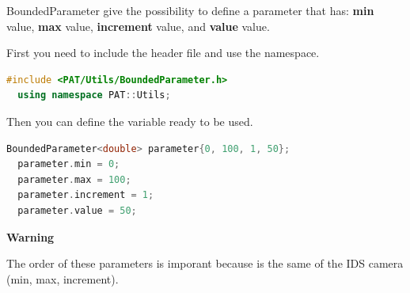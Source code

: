 
BoundedParameter give the possibility to define a parameter that has:
\textbf{min} value, \textbf{max} value, \textbf{increment} value, and
\textbf{value} value.

First you need to include the header file and use the namespace.

\begin{lstlisting}[language=c++, gobble=2]
  #include <PAT/Utils/BoundedParameter.h>
  using namespace PAT::Utils;
\end{lstlisting}

Then you can define the variable ready to be used.

\begin{lstlisting}[language=c++, gobble=2]
  BoundedParameter<double> parameter{0, 100, 1, 50};
  parameter.min = 0;
  parameter.max = 100;
  parameter.increment = 1;
  parameter.value = 50;
\end{lstlisting}

\textbf{Warning}

The order of these parameters is imporant because is the same of the IDS
camera (min, max, increment).
